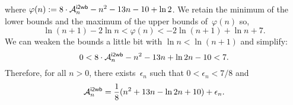 where \(\varphi(n) := 8 \cdot \M{\fun{i2wb}}{n} - n^2 - 13n - 10 + \ln
2\). We retain the minimum of the lower bounds and the maximum of the
upper bounds of~\(\varphi(n)\) so,
\begin{equation*}
\ln(n+1) - 2\ln n < \varphi(n) < -2\ln(n+1) + \ln n + 7.
\end{equation*}
We can weaken the bounds a little bit with \(\ln n < \ln(n+1)\) and
simplify:
\begin{equation*}
0 < 8 \cdot \M{\fun{i2wb}}{n} - n^2 - 13n + \ln 2n - 10 < 7.
\end{equation*}
Therefore, for all \(n > 0\), there exists~\(\epsilon_n\) such that
\(0 < \epsilon_n < 7/8\) and
\begin{equation}
\M{\fun{i2wb}}{n}
  = \frac{1}{8}(n^2 + 13n - \ln 2n + 10) + \epsilon_n.
\label{eq:ave_i2wb}
\end{equation}
